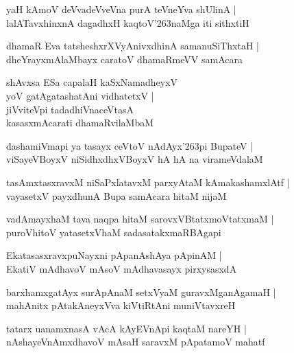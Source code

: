 \documentclass[twoside,12pt,openright]{book}
\def\S{\char'263}
\newcounter{shloka}[chapter]
\begin{document}
\begin{shloka}%
yaH kAmoV deVvadeVveVna purA teVneYva shUlinA |\\
lalATavxhinxnA dagadhxH kaqtoV\S naMga iti sithxtiH
\end{shloka}

\begin{shloka}%
dhamaR Eva tatsheshxrXVyAnivxdhinA samanuSiThxtaH |\\
dheYrayxmAlaMbayx caratoV dhamaRmeVV samAcara
\end{shloka}

\begin{shloka}%
shAvxsa ESa capalaH kaSxNamadheyxV \\
yoV gatAgatashatAni vidhatetxV |\\
jiVviteVpi tadadhiVnaceVtasA \\
kasasxmAcarati dhamaRvilaMbaM 
\end{shloka}

\begin{shloka}%
dashamiVmapi ya tasayx ceVtoV nAdAyx\S pi BupateV |\\
viSayeVBoyxV niSidhxdhxVBoyxV hA hA na virameVdalaM
\end{shloka}

\begin{shloka}%
tasAmxtasxravxM niSaPxlatavxM parxyAtaM kAmakashamxlAtf |\\
vayasetxV payxdhunA Bupa samAcara hitaM nijaM 
\end{shloka}

\begin{shloka}%
vadAmayxhaM tava naqpa hitaM sarovxVBtatxmoVtatxmaM |\\
puroVhitoV yatasetxVhaM sadasatakxmaRBAgapi
\end{shloka}

\begin{shloka}%
EkatasasxravxpuNayxni pApanAshAya pApinAM |\\
EkatiV mAdhavoV mAsoV mAdhavasayx pirxysasxdA 
\end{shloka}

\begin{shloka}%
barxhamxgatAyx surApAnaM setxVyaM guravxMganAgamaH |\\
mahAnitx pAtakAneyxVva kiVtiRtAni muniVtavxreH
\end{shloka}

\begin{shloka}%
tatarx uanamxnasA vAcA kAyEVnApi kaqtaM nareYH |\\
nAshayeVnAmxdhavoV mAsaH saravxM pApatamoV mahatf
\end{shloka}
\end{document}
